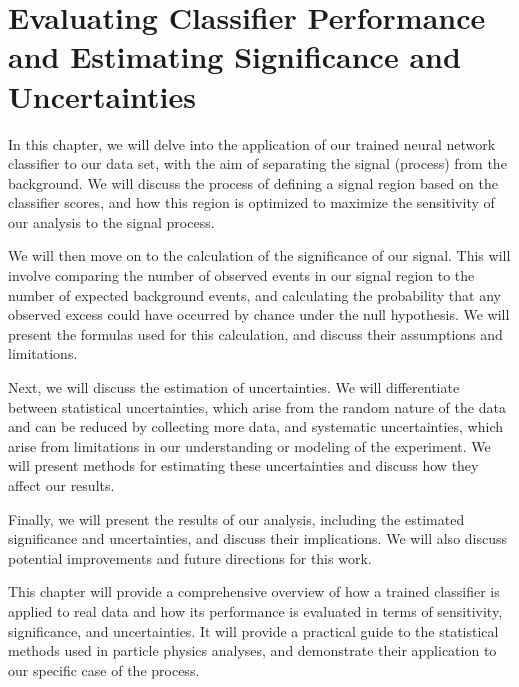 \chapter{Evaluating Classifier Performance and Estimating Significance and Uncertainties}

In this chapter, we will delve into the application of our trained neural network classifier to our data set, with the
aim of separating the signal (\ttH process) from the background. We will discuss the process of defining a signal region
based on the classifier scores, and how this region is optimized to maximize the sensitivity of our analysis to the
signal process.

We will then move on to the calculation of the significance of our signal. This will involve comparing the number of
observed events in our signal region to the number of expected background events, and calculating the probability that
any observed excess could have occurred by chance under the null hypothesis. We will present the formulas used for this
calculation, and discuss their assumptions and limitations.

Next, we will discuss the estimation of uncertainties. We will differentiate between statistical uncertainties, which
arise from the random nature of the data and can be reduced by collecting more data, and systematic uncertainties, which
arise from limitations in our understanding or modeling of the experiment. We will present methods for estimating these
uncertainties and discuss how they affect our results.

Finally, we will present the results of our analysis, including the estimated significance and uncertainties, and
discuss their implications. We will also discuss potential improvements and future directions for this work.

This chapter will provide a comprehensive overview of how a trained classifier is applied to real data and how its
performance is evaluated in terms of sensitivity, significance, and uncertainties. It will provide a practical guide to
the statistical methods used in particle physics analyses, and demonstrate their application to our specific case of the
\ttH process.



